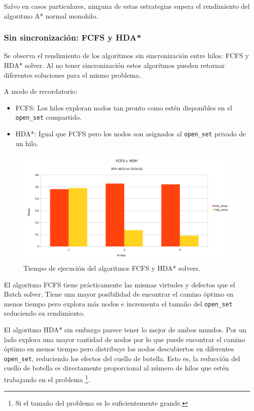 Salvo en casos particulares, ninguna de estas estrategias supera el rendimiento
del algoritmo A* normal monohilo.

\subsubsection{Sin sincronización: FCFS y HDA*}

Se observa el rendimiento de los algoritmos sin sincronización entre hilos:
FCFS y HDA* solver.
Al no tener sincronización estos algoritmos pueden retornar diferentes
soluciones para el mismo problema.

A modo de recordatorio:
\begin{itemize}[itemsep=0.25px]
    \item FCFS: Los hilos exploran nodos tan pronto como estén disponibles en el \lstinline{open_set} compartido.
    \item HDA*: Igual que FCFS pero los nodos son asignados al \lstinline{open_set} privado de un hilo.
\end{itemize}

\begin{figure}[h]
    \begin{center}
        \includegraphics[width=\textwidth]{Media/Ch2/Runtime_FCFSHDA.png}
    \end{center}
    \caption{Tiempo de ejecución del algoritmos FCFS y HDA* solvers.}
    \label{fig:FCFSHDA}
\end{figure}

El algoritmo FCFS tiene prácticamente las mismas virtudes y defectos que el Batch solver.
Tiene una mayor posibilidad de encontrar el camino óptimo en menos tiempo
pero explora más nodos e incrementa el tamaño del \lstinline{open_set}
reduciendo su rendimiento.

El algoritmo HDA* sin embargo parece tener lo mejor de ambos mundos.
Por un lado explora una mayor cantidad de nodos
por lo que puede encontrar el camino óptimo en menos tiempo
pero distribuye los nodos descubiertos en diferentes \lstinline{open_set},
reduciendo los efectos del cuello de botella.
Esto es, la reducción del cuello de botella es directamente proporcional
al número de hilos que estén trabajando en el problema
\footnote{Si el tamaño del problema es lo suficientemente grande.}.

